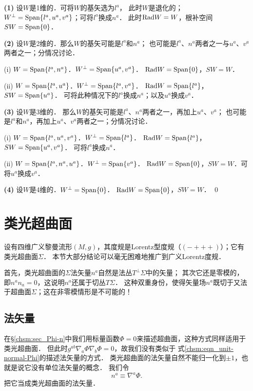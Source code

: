 {\noindent\heiti \bfseries (1)} 设$W$是1维的．可将$W$的基矢选为$l^a$，
此时$W$是退化的；$W^\perp ={\rm Span}\{l^a,u^a,v^a\}$；可将$l^a$换成$n^a$．
此时${\rm Rad}W=W$，根补空间$SW={\rm Span}\{0\}$．

{\noindent\heiti \bfseries (2)} 设$W$是2维的．那么$W$的基矢可能是$l^a$和$n^a$；
也可能是$l^a$、$n^a$两者之一与$u^a$、$v^a$两者之一；分情况讨论．

(i) $W={\rm Span}\{l^a,n^a\}$．$W^\perp ={\rm Span}\{u^a,v^a\}$．
${\rm Rad}W={\rm Span}\{0\}$，$SW=W$．

(ii) $W={\rm Span}\{l^a,u^a\}$．$W^\perp ={\rm Span}\{l^a,v^a\}$．
${\rm Rad}W={\rm Span}\{l^a\}$，$SW={\rm Span}\{u^a\}$．
可将此种情况下的$l^a$换成$n^a$；以及$u^a$换成$v^a$．

{\noindent\heiti \bfseries (3)} 设$W$是3维的．
那么$W$的基矢可能是$l^a$、$n^a$两者之一，再加上$u^a$、$v^a$；
也可能是$l^a$和$n^a$，再加上$u^a$、$ v^a$两者之一；分情况讨论．

(i) $W={\rm Span}\{l^a,u^a, v^a\}$．$W^\perp ={\rm Span}\{l^a\}$．
${\rm Rad}W={\rm Span}\{l^a\}$，$SW={\rm Span}\{u^a,v^a\}$．
可将$l^a$换成$n^a$．

(ii) $W={\rm Span}\{l^a,n^a,u^a\}$．$W^\perp ={\rm Span}\{v^a\}$．
${\rm Rad}W={\rm Span}\{0\}$，$SW=W$．可将$u^a$换成$v^a$．

{\noindent\heiti \bfseries (4)} 设$W$是4维的．$W^\perp ={\rm Span}\{0\}$．
${\rm Rad}W={\rm Span}\{0\}$，$SW=W$．
\qed







\section{类光超曲面} \label{chnull:sec_hypersurface-null}

设有四维广义黎曼流形$(M,g)$，其度规是Lorentz型度规（$(-+++)$）；它有类光超曲面$\Sigma$．
本节大部分结论可以毫无困难地推广到广义Lorentz度规．

首先，类光超曲面的$\Sigma$法矢量${n}^{a}$自然是法丛$T^\bot\Sigma$中的矢量；
其次它还是零模的，即${n}^{a}{n}_{a}=0$，这说明$n^a$还属于切丛$T\Sigma$．
这种双重身份，使得矢量场$n^a$既切于又法于超曲面$\Sigma$；这在非零模情形是不可能的！

\subsection{法矢量}
在\S\ref{chsm:sec_Phi-n}中我们用标量函数$\Phi=0$来描述超曲面，这种方式同样适用于类光超曲面．
但此时$g^{ab}\nabla_a \Phi\nabla_b\Phi=0$，故我们没有类似于
式\eqref{chsm:eqn_unit-normal-Phi}的描述法矢量的方式．
类光超曲面的法矢量自然不能归一化到$\pm 1$，也就是说它没有单位法矢量的概念．
我们令
\begin{equation}\label{chnull:eqn_unit-normal-Phi-null}
    n^a \equiv \nabla^a \Phi.
\end{equation}
把它当成类光超曲面的法矢量．


